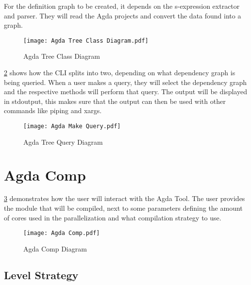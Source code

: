 For the definition graph to be created, it depends on the s-expression
extractor and parser. They will read the Agda projects and convert the data
found into a graph.

\begin{figure}[H]
    \centering
    \texttt{[image: Agda Tree Class Diagram.pdf]}
    \caption{Agda Tree Class Diagram}
    \label{fig:Agda Tree Class Diagram}
\end{figure} 
    
\pagebreak

\cref{fig:Agda Tree Query Diagram} shows how the CLI splits into two,
depending on what dependency graph is being queried. When a user makes a query,
they will select the dependency graph and the respective methods will perform
that query. The output will be displayed in stdoutput, this makes sure that the
output can then be used with other commands like piping and xargs.

\begin{figure}[H]
    \centering
    \texttt{[image: Agda Make Query.pdf]}
    \caption{Agda Tree Query Diagram}
    \label{fig:Agda Tree Query Diagram}
\end{figure} 

\pagebreak 


\section{Agda Comp}

\cref{fig:Agda Comp Diagram} demonstrates how the user will interact with
the Agda Tool. The user provides the module that will be compiled, next to some
parameters defining the amount of cores used in the parallelization and what
compilation strategy to use.
\begin{figure}[H]
    \centering 
    \texttt{[image: Agda Comp.pdf]}
    \caption{Agda Comp Diagram}
    \label{fig:Agda Comp Diagram}
\end{figure} 

\pagebreak
\subsection{Level Strategy} \label{sub:design level strategy}

